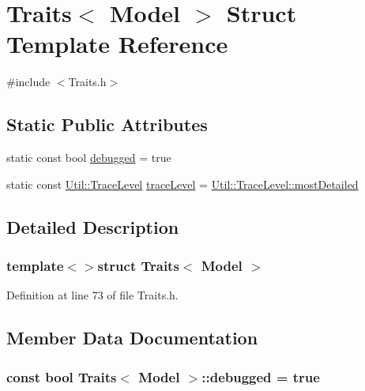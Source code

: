 \hypertarget{struct_traits_3_01_model_01_4}{\section{Traits$<$ Model $>$ Struct Template Reference}
\label{struct_traits_3_01_model_01_4}
}


{\ttfamily \#include $<$Traits.\-h$>$}

\subsection*{Static Public Attributes}
\begin{DoxyCompactItemize}
\item 
static const bool \hyperlink{struct_traits_3_01_model_01_4_a027110f826901a79353bd286be774fe4}{debugged} = true
\item 
static const \hyperlink{class_util_a0a3482cfa2d915e261c0cf528fdc7afc}{Util\-::\-Trace\-Level} \hyperlink{struct_traits_3_01_model_01_4_a2514a0ce35ca8177c4605b4b2266eb05}{trace\-Level} = \hyperlink{class_util_a0a3482cfa2d915e261c0cf528fdc7afcaac18d2ea075dba67f95df9a907eee741}{Util\-::\-Trace\-Level\-::most\-Detailed}
\end{DoxyCompactItemize}


\subsection{Detailed Description}
\subsubsection*{template$<$$>$struct Traits$<$ Model $>$}



Definition at line 73 of file Traits.\-h.



\subsection{Member Data Documentation}
\hypertarget{struct_traits_3_01_model_01_4_a027110f826901a79353bd286be774fe4}{
\subsubsection[{debugged}]{\setlength{\rightskip}{0pt plus 5cm}const bool {\bf Traits}$<$ {\bf Model} $>$\-::debugged = true\hspace{0.3cm}{\ttfamily [static]}}}\label{struct_traits_3_01_model_01_4_a027110f826901a79353bd286be774fe4}


